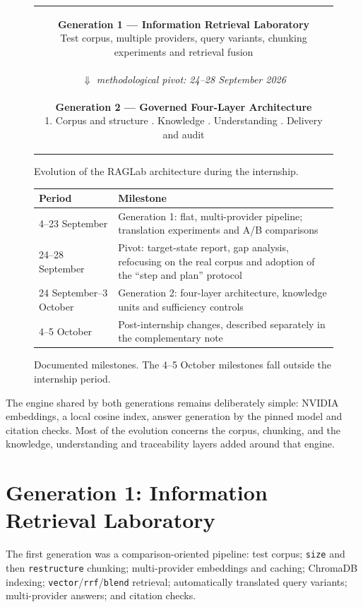 \documentclass[a4paper,12pt,openany]{report}
\begin{document}
\begin{figure}[H]
\centering
\begin{tabular}{c}
\colorbox{genone!10}{\parbox{0.86\textwidth}{\centering
  \textbf{Generation 1 — Information Retrieval Laboratory}\\
  Test corpus, multiple providers, query variants, chunking experiments and retrieval fusion}}
  \\[0.45em]
$\Downarrow$ \textit{methodological pivot: 24--28 September 2026}\\[0.45em]
\colorbox{gentwo!10}{\parbox{0.86\textwidth}{\centering
  \textbf{Generation 2 — Governed Four-Layer Architecture}\\[0.2em]
  1. Corpus and structure . Knowledge . Understanding . Delivery and audit}}
\end{tabular}
\caption{Evolution of the RAGLab architecture during the internship.}
\label{fig:architecture}
\end{figure}

\begin{figure}[H]
\centering
\begin{tabular}{p{3.6cm}p{10.2cm}}
\toprule
\textbf{Period} & \textbf{Milestone} \\
\midrule
4--23 September & Generation 1: flat, multi-provider pipeline; translation experiments and A/B
comparisons \\
24--28 September & Pivot: target-state report, gap analysis, refocusing on the real corpus and
adoption of the “step and plan” protocol \\
24 September--3 October & Generation 2: four-layer architecture, knowledge units and sufficiency
controls \\
4--5 October & Post-internship changes, described separately in the complementary note \\
\bottomrule
\end{tabular}
\caption{Documented milestones. The 4--5 October milestones fall outside the internship period.}
\label{fig:chronology}
\end{figure}

The engine shared by both generations remains deliberately simple: NVIDIA embeddings, a local
cosine index, answer generation by the pinned model and citation checks. Most of the evolution
concerns the corpus, chunking, and the knowledge, understanding and traceability layers added
around that engine.

\section{Generation 1: Information Retrieval Laboratory}
The first generation was a comparison-oriented pipeline: test corpus; \texttt{size} and then
\texttt{restructure} chunking; multi-provider embeddings and caching; ChromaDB indexing;
\texttt{vector}/\texttt{rrf}/\texttt{blend} retrieval; automatically translated query variants;
multi-provider answers; and citation checks.
\end{document}
